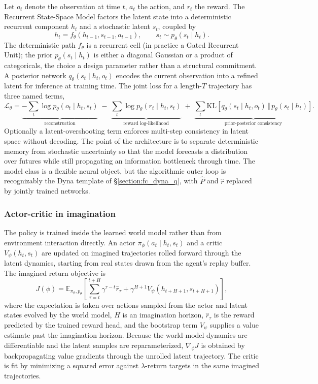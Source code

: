 Let $o_t$ denote the observation at time $t$, $a_t$ the action, and $r_t$ the reward. The Recurrent State-Space Model factors the latent state into a deterministic recurrent component $h_t$ and a stochastic latent $s_t$, coupled by
\[ h_t = f_\theta(h_{t-1}, s_{t-1}, a_{t-1}), \qquad s_t \sim p_\theta(s_t \mid h_t). \]
The deterministic path $f_\theta$ is a recurrent cell (in practice a Gated Recurrent Unit); the prior $p_\theta(s_t \mid h_t)$ is either a diagonal Gaussian or a product of categoricals, the choice a design parameter rather than a structural commitment. A posterior network $q_\theta(s_t \mid h_t, o_t)$ encodes the current observation into a refined latent for inference at training time. The joint loss for a length-$T$ trajectory has three named terms,
\[ \mathcal{L}_\theta = \underbrace{-\sum_t \log p_\theta(o_t \mid h_t, s_t)}_{\text{reconstruction}} \;-\; \underbrace{\sum_t \log p_\theta(r_t \mid h_t, s_t)}_{\text{reward log-likelihood}} \;+\; \underbrace{\sum_t \mathrm{KL}\!\left[ q_\theta(s_t \mid h_t, o_t) \,\Vert\, p_\theta(s_t \mid h_t) \right]}_{\text{prior-posterior consistency}}. \]
Optionally a latent-overshooting term enforces multi-step consistency in latent space without decoding. The point of the architecture is to separate deterministic memory from stochastic uncertainty so that the model forecasts a distribution over futures while still propagating an information bottleneck through time. The model class is a flexible neural object, but the algorithmic outer loop is recognizably the Dyna template of \S\ref{section:fc_dyna_q}, with $\widehat P$ and $\widehat r$ replaced by jointly trained networks.

\subsubsection{Actor-critic in imagination}
\label{section:fc_rssm_imagination}

The policy is trained inside the learned world model rather than from environment interaction directly. An actor $\pi_\phi(a_t \mid h_t, s_t)$ and a critic $V_\psi(h_t, s_t)$ are updated on imagined trajectories rolled forward through the latent dynamics, starting from real states drawn from the agent's replay buffer. The imagined return objective is
\[ J(\phi) = \mathbb{E}_{\pi_\phi, p_\theta}\!\left[ \sum_{\tau = t}^{t+H} \gamma^{\tau - t} \hat r_\tau + \gamma^{H+1} V_\psi(h_{t+H+1}, s_{t+H+1}) \right], \]
where the expectation is taken over actions sampled from the actor and latent states evolved by the world model, $H$ is an imagination horizon, $\hat r_\tau$ is the reward predicted by the trained reward head, and the bootstrap term $V_\psi$ supplies a value estimate past the imagination horizon. Because the world-model dynamics are differentiable and the latent samples are reparameterized, $\nabla_\phi J$ is obtained by backpropagating value gradients through the unrolled latent trajectory. The critic is fit by minimizing a squared error against $\lambda$-return targets in the same imagined trajectories.

